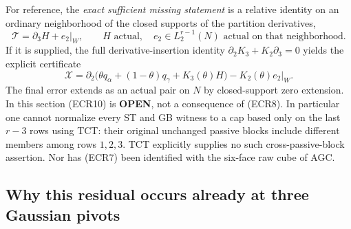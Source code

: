For reference, the \emph{exact sufficient missing statement} is
a relative identity on an ordinary neighborhood of the closed
supports of the partition derivatives,
\[
              \mathcal T=\partial_3 H+e_2|_W,
         \qquad H\text{ actual},\quad e_2\in L_2^{r-1}(N)
                       \text{ actual on that neighborhood}.
 \tag{ECR10}
\]
If it is supplied, the full derivative-insertion identity
$\partial_2K_3+K_2\partial_3=0$ yields the explicit certificate
\[
 \mathcal X
   =\partial_2\bigl(\theta q_\alpha+(1-\theta)q_\gamma
                                  +K_3(\theta)H\bigr)
                               -K_2(\theta)e_2|_W.
 \tag{ECR11}
\]
The final error extends as an actual pair on $N$ by closed-support
zero extension.  In this section (ECR10) is \textbf{OPEN}, not a
consequence of (ECR8).  In particular one cannot normalize every
ST and GB witness to a cap based only on the last $r-3$ rows
using TCT: their original unchanged passive blocks include
different members among rows $1,2,3$.  TCT explicitly supplies
no such cross-passive-block assertion.  Nor has (ECR7) been
identified with the six-face raw cube of AGC.

\subsection{Why this residual occurs already at three Gaussian pivots}

